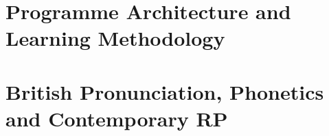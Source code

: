\documentclass[
    12pt,
    a4paper,
    oneside,
    openany
]{book}
\begin{document}
\tableofcontents


\mainmatter



\part{Programme Architecture and Learning Methodology}

% 

% 

% 



\part{British Pronunciation, Phonetics and Contemporary RP}

% 



% 

\end{document}
